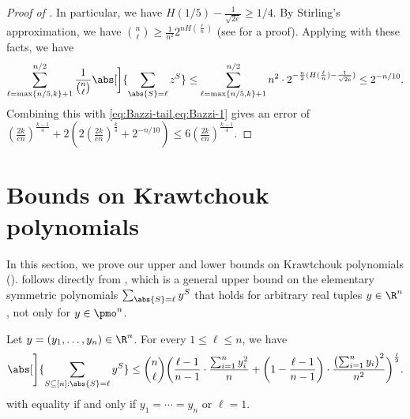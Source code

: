 \begin{proof}[Proof of ]
  In particular, we have $H(1/5) - \frac{1}{\sqrt{2e}} \ge 1/4$.
  By Stirling's approximation, we have $\binom{n}{\ell} \ge \frac{1}{n^2} 2^{n H(\frac{\ell}{n})}$ (see \cite{CT06} for a proof).
  Applying  with these facts, we have
  \begin{align*}
    \sum_{\ell=\max\{n/5,k\}+1}^{n/2} \frac{1}{\binom{n}{\ell}} \abs[\bigg]{\sum_{\abs{S}=\ell} z^S}
    \le \sum_{\ell=\max\{n/5,k\}+1}^{n/2} n^2 \cdot 2^{-\frac{n}{2}(H(\frac{\ell}{n}) - \frac{1}{\sqrt{2e}})}
    \le 2^{-n/10} .
  \end{align*}
  Combining this with \cref{eq:Bazzi-tail,eq:Bazzi-1} gives an error of $(\frac{2k}{en})^{\frac{k-1}{4}} + 2(2(\frac{2k}{en})^{\frac{k}{4}} + 2^{-n/10}) \le 6 (\frac{2k}{en})^{\frac{k-1}{4}}$. \qedhere
\end{proof}

\section{Bounds on Krawtchouk polynomials} \label{sec:Kraw-bounds}

In this section, we prove our upper and lower bounds on Krawtchouk polynomials ().   follows directly from , which is a general upper bound on the elementary symmetric polynomials $\sum_{\abs{S}=\ell} y^S$ that holds for arbitrary real tuples $y \in \R^n$, not only for $y \in \pmo^n$.

\begin{lemma} \label{lemma:elem-sym-ineq}
  Let $y = (y_1, \ldots, y_n) \in \R^n$.
  For every $1 \le \ell \le n$, we have
  \[
  \abs[\Bigg]{ \sum_{S \subseteq [n]: \abs{S}=\ell} y^S }
    \le \binom{n}{\ell}  \biggl( \frac{\ell-1}{n-1} \cdot \frac{\sum_{i=1}^n y_i^2}{n} + \left(1 - \frac{\ell-1}{n-1} \right) \cdot \frac{\bigl(\sum_{i=1}^n y_i\bigr)^2}{n^2} \biggr)^{\frac{\ell}{2}} .
  \]
  with equality if and only if $y_1 = \cdots = y_n$ or $\ell=1$.
\end{lemma}

